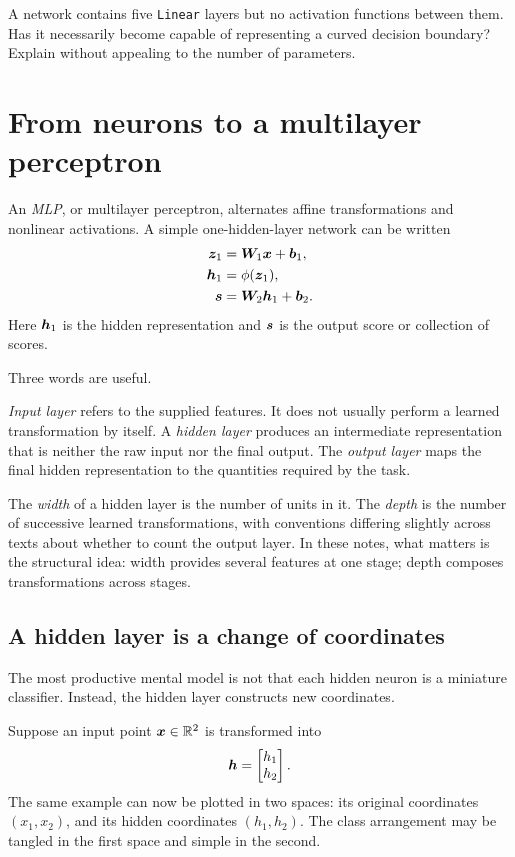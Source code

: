 \begin{checkpointbox}
A network contains five \texttt{Linear} layers but no activation functions between them. Has it necessarily become capable of representing a curved decision boundary? Explain without appealing to the number of parameters.
\end{checkpointbox}

\section{From neurons to a multilayer perceptron}

An \emph{MLP}, or multilayer perceptron, alternates affine transformations and nonlinear activations. A simple one-hidden-layer network can be written
\begin{align}
  \bm{z}_1 &= \bm{W}_1\bm{x}+\bm{b}_1,\\
  \bm{h}_1 &= \phi(\bm{z}_1),\\
  \bm{s} &= \bm{W}_2\bm{h}_1+\bm{b}_2.
  \label{eq:week3-mlp}
\end{align}
Here \(\bm{h}_1\) is the hidden representation and \(\bm{s}\) is the output score or collection of scores.

Three words are useful.

\emph{Input layer} refers to the supplied features. It does not usually perform a learned transformation by itself. A \emph{hidden layer} produces an intermediate representation that is neither the raw input nor the final output. The \emph{output layer} maps the final hidden representation to the quantities required by the task.

The \emph{width} of a hidden layer is the number of units in it. The \emph{depth} is the number of successive learned transformations, with conventions differing slightly across texts about whether to count the output layer. In these notes, what matters is the structural idea: width provides several features at one stage; depth composes transformations across stages.

\subsection{A hidden layer is a change of coordinates}

The most productive mental model is not that each hidden neuron is a miniature classifier. Instead, the hidden layer constructs new coordinates.

Suppose an input point \(\bm{x}\in\mathbb{R}^2\) is transformed into
\[
  \bm{h}=\begin{bmatrix}h_1\\h_2\end{bmatrix}.
\]
The same example can now be plotted in two spaces: its original coordinates \((x_1,x_2)\), and its hidden coordinates \((h_1,h_2)\). The class arrangement may be tangled in the first space and simple in the second.


